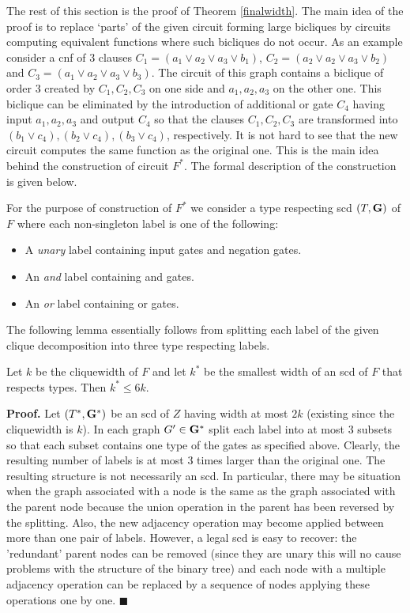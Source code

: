 \documentclass{llncs}
\begin{document}
The rest of this section is the proof of Theorem \ref{finalwidth}.
The main idea of the proof is to replace `parts' of the given circuit forming large
bicliques by circuits computing equivalent functions where such bicliques do not occur.
As an example consider a {\sc cnf} of $3$ clauses $C_1=(a_1 \vee a_2 \vee a_3 \vee b_1)$,
$C_2=(a_2 \vee a_2 \vee a_3 \vee b_2)$ and $C_3=(a_1 \vee a_2 \vee a_3 \vee b_3)$. The circuit of this graph contains a biclique of order $3$ created by $C_1,C_2,C_3$
on one side and $a_1,a_2,a_3$ on the other one. This biclique can be eliminated 
by the introduction of additional {\sc or} gate $C_4$ having input $a_1,a_2,a_3$ and output $C_4$ so that the clauses $C_1,C_2,C_3$ are transformed into $(b_1 \vee c_4),(b_2 \vee c_4),(b_3 \vee c_4)$, 
respectively. It is not hard to see that the new circuit computes the same function as the original 
one. This is the main idea behind the construction of circuit $F^*$. The formal description
of the construction is given below.


For the purpose of construction of $F^*$
we consider a type respecting {\sc scd} $(T,{\bf G})$ of $F$ where each non-singleton label is one of the following:
\begin{itemize}
\item A \emph{unary} label containing input gates and negation gates.
\item An \emph{{\sc and}} label containing {\sc and} gates.
\item An \emph{{\sc or}} label containing {\sc or} gates.
\end{itemize}
 
The following lemma essentially follows from splitting each label of the given clique decomposition into
three type respecting labels. 

\begin{lemma} \label{typerespect}
Let $k$ be the cliquewidth of $F$ and let $k^*$ be the smallest width of an {\sc scd} of $F$
that respects types. Then $k^* \leq 6k$.
\end{lemma}

{\bf Proof.}
Let $(T^*, {\bf G^*})$ be an {\sc scd} of $Z$ having width at most $2k$ (existing since
the cliquewidth is $k$).
In each graph $G' \in {\bf G^*}$ split each label into at most $3$ subsets so that
each subset contains one type of the gates as specified above. Clearly, the resulting
number of labels is at most $3$ times larger than the original one. The resulting
structure is not necessarily an {\sc scd}. In particular, there may
be situation when the graph associated with a node is the same as the graph associated 
with the parent node because the union operation in the parent has been reversed by
the splitting. Also, the new adjacency operation may become applied between more than
one pair of labels. However, a legal {\sc scd} is easy to recover:
the 'redundant' parent nodes can be removed (since they are unary this will no
cause problems with the structure of the binary tree) and each node with
a multiple adjacency operation can be replaced by a sequence of nodes applying these
operations one by one. $\blacksquare$
\end{document}
